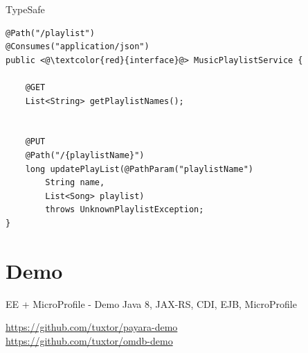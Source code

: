 \documentclass{beamer}
\begin{document}
\begin{frame}[fragile]{TypeSafe}


\begin{lstlisting}
@Path("/playlist")
@Consumes("application/json")
public <@\textcolor{red}{interface}@> MusicPlaylistService {

	@GET
	List<String> getPlaylistNames();

	
	@PUT
	@Path("/{playlistName}")
	long updatePlayList(@PathParam("playlistName")
		String name,
		List<Song> playlist)
		throws UnknownPlaylistException;
}
\end{lstlisting}
\end{frame}


\section{Demo}
\begin{frame}{EE + MicroProfile  - Demo}
\huge Java 8, JAX-RS, CDI, EJB, MicroProfile

\normalsize  \url{https://github.com/tuxtor/payara-demo}\\
\normalsize  \url{https://github.com/tuxtor/omdb-demo}
\end{frame}
\end{document}
